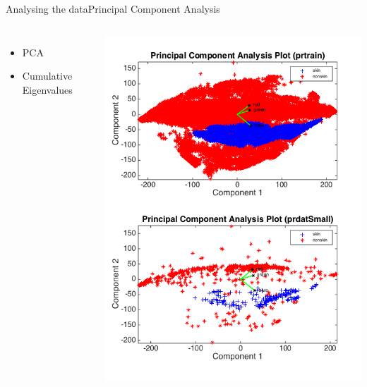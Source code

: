 \documentclass{beamer}
\begin{document}
\begin{frame}{Analysing the data}{Principal Component Analysis}
    \begin{columns}
    \begin{itemize}
        \item PCA
        \item Cumulative Eigenvalues
        
        
    \end{itemize}
        \includegraphics[scale=0.2]{PCAplot.png}
    \end{columns}
\end{frame}
\end{document}
